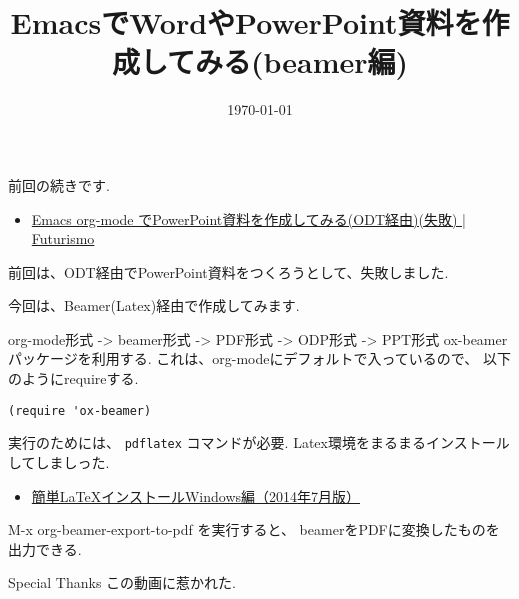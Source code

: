 \documentclass[presentation]{beamer}
\author{}
\date{\today}
\title{EmacsでWordやPowerPoint資料を作成してみる(beamer編)}
\begin{document}
\maketitle
前回の続きです.
\begin{itemize}
\item \href{http://futurismo.biz/archives/3601}{Emacs org-mode でPowerPoint資料を作成してみる(ODT経由)(失敗) | Futurismo}
\end{itemize}

前回は、ODT経由でPowerPoint資料をつくろうとして、失敗しました.

今回は、Beamer(Latex)経由で作成してみます.

\begin{frame}[fragile,label=sec-1]{org-mode形式 -> beamer形式 -> PDF形式 -> ODP形式 -> PPT形式}
 ox-beamerパッケージを利用する. これは、org-modeにデフォルトで入っているので、
以下のようにrequireする.

\begin{verbatim}
(require 'ox-beamer)
\end{verbatim}

実行のためには、 \texttt{pdflatex} コマンドが必要.
Latex環境をまるまるインストールしてしましった.
\begin{itemize}
\item \href{http://did2memo.net/2014/03/06/easy-latex-install-windows-8-2014-03/}{簡単\LaTeX{}インストールWindows編（2014年7月版）}
\end{itemize}

M-x org-beamer-export-to-pdf を実行すると、
beamerをPDFに変換したものを出力できる.



\begin{block}{Special Thanks}
この動画に惹かれた.
\end{block}
\end{frame}
\end{document}
